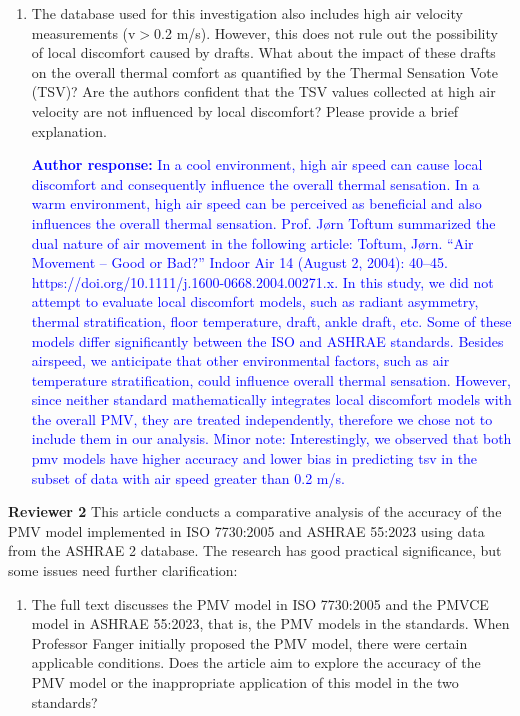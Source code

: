 \documentclass[a4paper, 10pt]{letter}
\newcommand{\response}[1]{\textcolor{blue}{\textbf{Author response:} #1}}
\begin{document}
\begin{letter}
\begin{enumerate}
            \item The database used for this investigation also includes high air velocity measurements (v$>$0.2 m/s).
            However, this does not rule out the possibility of local discomfort caused by drafts.
            What about the impact of these drafts on the overall thermal comfort as quantified by the Thermal Sensation Vote (TSV)?
            Are the authors confident that the TSV values collected at high air velocity are not influenced by local discomfort?
            Please provide a brief explanation.

            \response{In a cool environment, high air speed can cause local discomfort and consequently influence the overall thermal sensation.
            In a warm environment, high air speed can be perceived as beneficial and also influences the overall thermal sensation. Prof. Jørn Toftum summarized the dual nature of air movement in the following article: Toftum, Jørn. “Air Movement – Good or Bad?” Indoor Air 14 (August 2, 2004): 40–45. https://doi.org/10.1111/j.1600-0668.2004.00271.x. 
            In this study, we did not attempt to evaluate local discomfort models, such as radiant asymmetry, thermal stratification, floor temperature, draft, ankle draft, etc. 
            Some of these models differ significantly between the ISO and ASHRAE standards. 
            Besides airspeed, we anticipate that other environmental factors, such as air temperature stratification, could influence overall thermal sensation. 
            However, since neither standard mathematically integrates local discomfort models with the overall PMV, they are treated independently, therefore we chose not to include them in our analysis. 
            Minor note: Interestingly, we observed that both \ac{pmv} models have higher accuracy and lower bias in predicting \ac{tsv} in the subset of data with air speed greater than 0.2 m/s.}
        \end{enumerate}

        \textbf{Reviewer 2}
        This article conducts a comparative analysis of the accuracy of the PMV model implemented in ISO 7730:2005 and ASHRAE 55:2023 using data from the ASHRAE 2 database.
        The research has good practical significance, but some issues need further clarification:

        \begin{enumerate}
            \item The full text discusses the PMV model in ISO 7730:2005 and the PMVCE model in ASHRAE 55:2023, that is, the PMV models in the standards.
            When Professor Fanger initially proposed the PMV model, there were certain applicable conditions.
            Does the article aim to explore the accuracy of the PMV model or the inappropriate application of this model in the two standards?


\end{enumerate}
\end{letter}
\end{document}
